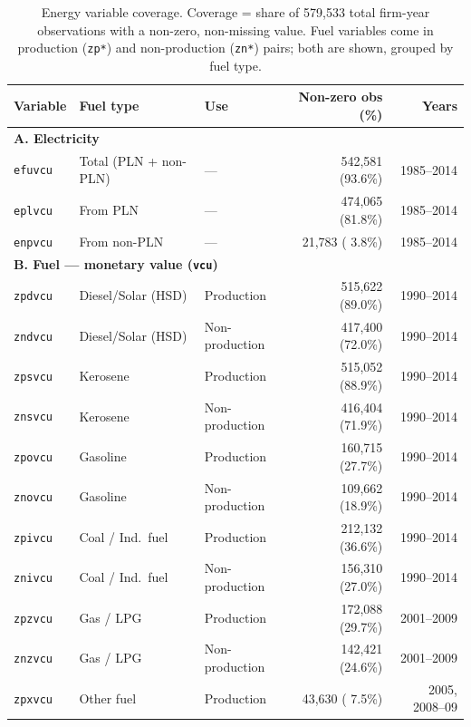 \documentclass[11pt, a4paper]{article}
\begin{document}
\begin{table}[H]
\centering
\caption{Energy variable coverage. Coverage = share of 579,533 total firm-year observations
  with a non-zero, non-missing value. Fuel variables come in production (\texttt{zp*})
  and non-production (\texttt{zn*}) pairs; both are shown, grouped by fuel type.}
\label{tab:coverage}
\begin{tabular}{llp{2.8cm}rr}
\toprule
\textbf{Variable} & \textbf{Fuel type} & \textbf{Use} & \textbf{Non-zero obs (\%)} & \textbf{Years} \\
\midrule
\multicolumn{5}{l}{\textbf{A. Electricity}} \\
\texttt{efuvcu} & Total (PLN + non-PLN) & ---            & 542,581 (93.6\%) & 1985--2014 \\
\texttt{eplvcu} & From PLN              & ---            & 474,065 (81.8\%) & 1985--2014 \\
\texttt{enpvcu} & From non-PLN          & ---            &  21,783 ( 3.8\%) & 1985--2014 \\
\midrule
\multicolumn{5}{l}{\textbf{B. Fuel --- monetary value (\texttt{vcu})}} \\
\texttt{zpdvcu} & Diesel/Solar (HSD) & Production     & 515,622 (89.0\%) & 1990--2014 \\
\texttt{zndvcu} & Diesel/Solar (HSD) & Non-production & 417,400 (72.0\%) & 1990--2014 \\
\texttt{zpsvcu} & Kerosene           & Production     & 515,052 (88.9\%) & 1990--2014 \\
\texttt{znsvcu} & Kerosene           & Non-production & 416,404 (71.9\%) & 1990--2014 \\
\texttt{zpovcu} & Gasoline           & Production     & 160,715 (27.7\%) & 1990--2014 \\
\texttt{znovcu} & Gasoline           & Non-production & 109,662 (18.9\%) & 1990--2014 \\
\texttt{zpivcu} & Coal / Ind.\ fuel  & Production     & 212,132 (36.6\%) & 1990--2014 \\
\texttt{znivcu} & Coal / Ind.\ fuel  & Non-production & 156,310 (27.0\%) & 1990--2014 \\
\texttt{zpzvcu} & Gas / LPG          & Production     & 172,088 (29.7\%) & 2001--2009 \\
\texttt{znzvcu} & Gas / LPG          & Non-production & 142,421 (24.6\%) & 2001--2009 \\
\texttt{zpxvcu} & Other fuel         & Production     &  43,630 ( 7.5\%) & 2005, 2008--09 \\

\end{tabular}
\end{table}
\end{document}
